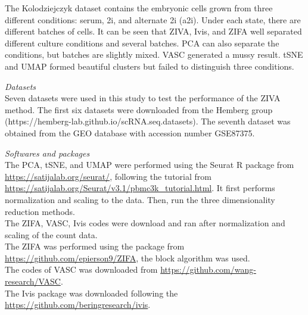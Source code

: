 The Kolodziejczyk dataset contains the embryonic cells grown from three different conditions: serum, 2i, and alternate 2i (a2i). Under each state, there are different batches of cells. It can be seen that ZIVA, Ivis, and ZIFA well separated different culture conditions and several batches. PCA can also separate the conditions, but batches are slightly mixed. VASC generated a mussy result. tSNE and UMAP formed beautiful clusters but failed to distinguish three conditions.

\vspace{0.5cm}
\noindent\emph{Datasets} \\
Seven datasets were used in this study to test the performance of the ZIVA method. The first six datasets were downloaded from the Hemberg group (https://hemberg-lab.github.io/scRNA.seq.datasets). The seventh dataset was obtained from the GEO database with accession number GSE87375.

\vspace{0.5cm}
\noindent\emph{Softwares and packages} \\
The PCA, tSNE, and UMAP were performed using the Seurat R package from \url{https://satijalab.org/seurat/}, following the tutorial from \url{https://satijalab.org/Seurat/v3.1/pbmc3k_tutorial.html}. It first performs normalization and scaling to the data. Then, run the three dimensionality reduction methods.\\
The ZIFA, VASC, Ivis codes were download and ran after normalization and scaling of the count data.\\
The ZIFA was performed using the package from \url{https://github.com/epierson9/ZIFA}, the block algorithm was used.\\
The codes of VASC was downloaded from \url{https://github.com/wang-research/VASC}.\\
The Ivis package was downloaded following the \url{https://github.com/beringresearch/ivis}.

